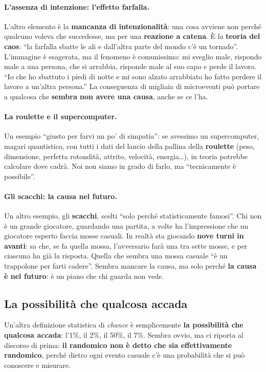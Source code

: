 \paragraph{L'assenza di intenzione: l'effetto farfalla.} L'altro elemento è la
\textbf{mancanza di intenzionalità}: una cosa avviene non perché qualcuno voleva che
succedesse, ma per una \textbf{reazione a catena}. È la \textbf{teoria del caos}: ``la
farfalla sbatte le ali e dall'altra parte del mondo c'è un tornado''. L'immagine è
esagerata, ma il fenomeno è comunissimo: mi sveglio male, rispondo male a una persona, che si
arrabbia, risponde male al suo capo e perde il lavoro. ``Io che ho sbattuto i piedi di notte
e mi sono alzato arrabbiato ho fatto perdere il lavoro a un'altra persona.'' La conseguenza
di migliaia di microeventi può portare a qualcosa che \textbf{sembra non avere una causa},
anche se ce l'ha.

\paragraph{La roulette e il supercomputer.} Un esempio ``giusto per farvi un po' di
simpatia'': se avessimo un supercomputer, magari quantistico, con tutti i dati del lancio
della pallina della \textbf{roulette} (peso, dimensione, perfetta rotondità, attrito,
velocità, energia\ldots), in teoria potrebbe calcolare dove cadrà. Noi non siamo in grado di
farlo, ma ``tecnicamente è possibile''.

\paragraph{Gli scacchi: la causa nel futuro.} Un altro esempio, gli \textbf{scacchi}, scelti
``solo perché statisticamente famosi''. Chi non è un grande giocatore, guardando una
partita, a volte ha l'impressione che un giocatore esperto faccia mosse casuali. In realtà
sta giocando \textbf{nove turni in avanti}: sa che, se fa quella mossa, l'avversario farà
una tra sette mosse, e per ciascuna ha già la risposta. Quella che sembra una mossa casuale
``è un trappolone per farti cadere''. Sembra mancare la causa, ma solo perché \textbf{la causa
è nel futuro}: è un piano che chi guarda non vede.

\subsection{La possibilità che qualcosa accada}

Un'altra definizione statistica di \emph{chance} è semplicemente \textbf{la possibilità che
qualcosa accada}: l'1\%, il 2\%, il 50\%, il 7\%. Sembra ovvio, ma ci riporta al discorso di
prima: \textbf{il randomico non è detto che sia effettivamente randomico}, perché dietro ogni
evento casuale c'è una probabilità che si può conoscere e misurare.

